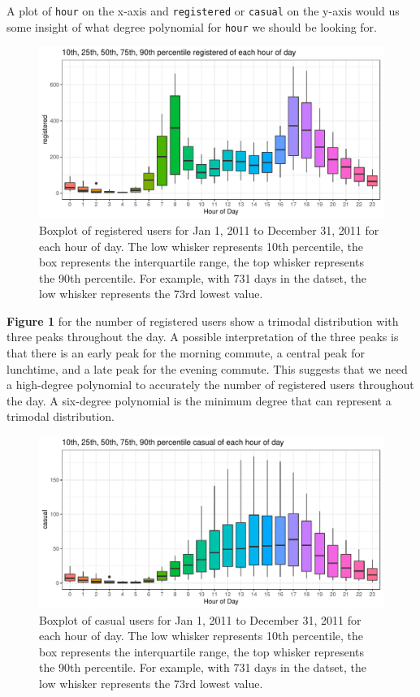 \documentclass[
]{article}
\begin{document}
A plot of \texttt{hour} on the x-axis and \texttt{registered} or
\texttt{casual} on the y-axis would us some insight of what degree
polynomial for \texttt{hour} we should be looking for.

\begin{figure}
\centering
\includegraphics{LeastSquares_files/figure-latex/unnamed-chunk-1-1.pdf}
\caption{Boxplot of registered users for Jan 1, 2011 to December 31,
2011 for each hour of day. The low whisker represents 10th percentile,
the box represents the interquartile range, the top whisker represents
the 90th percentile. For example, with 731 days in the datset, the low
whisker represents the 73rd lowest value.}
\end{figure}

\textbf{Figure 1} for the number of registered users show a trimodal
distribution with three peaks throughout the day. A possible
interpretation of the three peaks is that there is an early peak for the
morning commute, a central peak for lunchtime, and a late peak for the
evening commute. This suggests that we need a high-degree polynomial to
accurately the number of registered users throughout the day. A
six-degree polynomial is the minimum degree that can represent a
trimodal distribution.

\begin{figure}
\centering
\includegraphics{LeastSquares_files/figure-latex/unnamed-chunk-2-1.pdf}
\caption{Boxplot of casual users for Jan 1, 2011 to December 31, 2011
for each hour of day. The low whisker represents 10th percentile, the
box represents the interquartile range, the top whisker represents the
90th percentile. For example, with 731 days in the datset, the low
whisker represents the 73rd lowest value.}
\end{figure}
\end{document}
